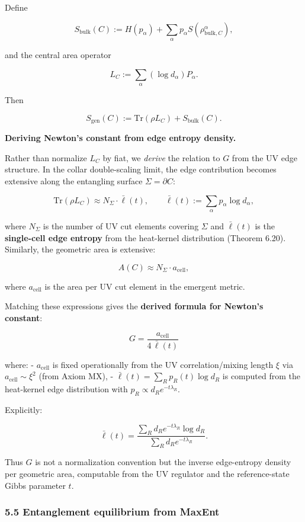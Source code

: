 \documentclass[
]{article}
\begin{document}
Define

\[
S_{\mathrm{bulk}}(C) := H(p_{\alpha}) + \sum_{\alpha} p_{\alpha} S(\rho_{\mathrm{bulk},C}^{\alpha}),
\]

and the central area operator

\[
L_C := \sum_{\alpha} (\log d_{\alpha}) P_{\alpha}.
\]

Then

\[
S_{\mathrm{gen}}(C) := \mathrm{Tr}(\rho L_C) + S_{\mathrm{bulk}}(C).
\]

\textbf{Deriving Newton's constant from edge entropy density.}

Rather than normalize \(L_C\) by fiat, we \emph{derive} the relation to
\(G\) from the UV edge structure. In the collar double-scaling limit,
the edge contribution becomes extensive along the entangling surface
\(\Sigma = \partial C\):

\[
\mathrm{Tr}(\rho L_C) \approx N_\Sigma \cdot \bar{\ell}(t),
\qquad
\bar{\ell}(t) := \sum_\alpha p_\alpha \log d_\alpha,
\]

where \(N_\Sigma\) is the number of UV cut elements covering \(\Sigma\)
and \(\bar{\ell}(t)\) is the \textbf{single-cell edge entropy} from the
heat-kernel distribution (Theorem 6.20). Similarly, the geometric area
is extensive:

\[
A(C) \approx N_\Sigma \cdot a_{\mathrm{cell}},
\]

where \(a_{\mathrm{cell}}\) is the area per UV cut element in the
emergent metric.

Matching these expressions gives the \textbf{derived formula for
Newton's constant}:

\[
G = \frac{a_{\mathrm{cell}}}{4 \, \bar{\ell}(t)}
\]

where: - \(a_{\mathrm{cell}}\) is fixed operationally from the UV
correlation/mixing length \(\xi\) via \(a_{\mathrm{cell}} \sim \xi^2\)
(from Axiom MX), - \(\bar{\ell}(t) = \sum_R p_R(t) \log d_R\) is
computed from the heat-kernel edge distribution with
\(p_R \propto d_R e^{-t\lambda_R}\).

Explicitly:

\[
\bar{\ell}(t) = \frac{\sum_R d_R e^{-t\lambda_R} \log d_R}{\sum_R d_R e^{-t\lambda_R}}.
\]

Thus \(G\) is not a normalization convention but the inverse
edge-entropy density per geometric area, computable from the UV
regulator and the reference-state Gibbs parameter \(t\).

\subsubsection{5.5 Entanglement equilibrium from
MaxEnt}\label{entanglement-equilibrium-from-maxent}
\end{document}
